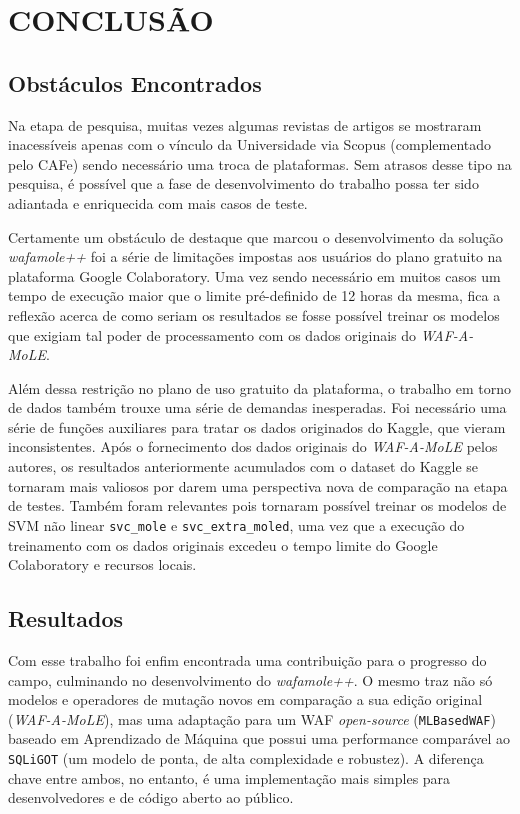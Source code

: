 \chapter{CONCLUSÃO}
\label{chp:capitulo6}

\section{Obstáculos Encontrados}

Na etapa de pesquisa, muitas vezes algumas revistas de artigos se mostraram inacessíveis apenas com o vínculo da Universidade via Scopus (complementado pelo CAFe) sendo necessário uma troca de plataformas. Sem atrasos desse tipo na pesquisa, é possível que a fase de desenvolvimento do trabalho possa ter sido adiantada e enriquecida com mais casos de teste.

Certamente um obstáculo de destaque que marcou o desenvolvimento da solução \textit{wafamole++} foi a série de limitações impostas aos usuários do plano gratuito na plataforma Google Colaboratory. Uma vez sendo necessário em muitos casos um tempo de execução maior que o limite pré-definido de 12 horas da mesma, fica a reflexão acerca de como seriam os resultados se fosse possível treinar os modelos que exigiam tal poder de processamento com os dados originais do \textit{WAF-A-MoLE}.

Além dessa restrição no plano de uso gratuito da plataforma, o trabalho em torno de dados também trouxe uma série de demandas inesperadas. Foi necessário uma série de funções auxiliares para tratar os dados originados do Kaggle, que vieram inconsistentes. Após o fornecimento dos dados originais do \textit{WAF-A-MoLE} pelos autores, os resultados anteriormente acumulados com o dataset do Kaggle se tornaram mais valiosos por darem uma perspectiva nova de comparação na etapa de testes. Também foram relevantes pois tornaram possível treinar os modelos de SVM não linear \verb+svc_mole+ e \verb+svc_extra_moled+, uma vez que a execução do treinamento com os dados originais excedeu o tempo limite do Google Colaboratory e recursos locais.

\section{Resultados}

Com esse trabalho foi enfim encontrada uma contribuição para o progresso do campo, culminando no desenvolvimento do \textit{wafamole++}. O mesmo traz não só modelos e operadores de mutação novos em comparação a sua edição original (\textit{WAF-A-MoLE}), mas uma adaptação para um WAF \textit{open-source} (\verb+MLBasedWAF+) baseado em Aprendizado de Máquina que possui uma performance comparável ao \verb+SQLiGOT+ (um modelo de ponta, de alta complexidade e robustez). A diferença chave entre ambos, no entanto, é uma implementação mais simples para desenvolvedores e de código aberto ao público.

